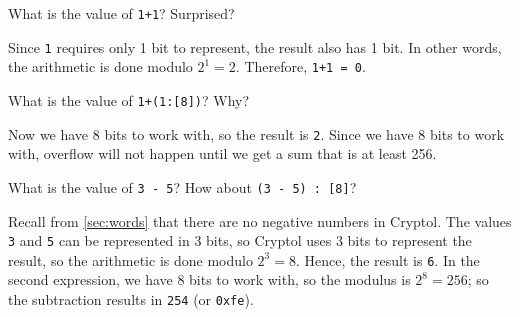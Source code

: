 
\begin{Exercise}\label{ex:arith:1}
What is the value of {\tt 1+1}? Surprised?
\end{Exercise}
\begin{Answer}
  Since {\tt 1} requires only 1 bit to represent, the result also has
  1 bit. In other words, the arithmetic is done modulo $2^1 =
  2$. Therefore, {\tt 1+1 = 0}.
\end{Answer}

\begin{Exercise}\label{ex:arith:2}
What is the value of {\tt 1+(1:[8])}? Why?
\end{Exercise}
\begin{Answer}
  Now we have 8 bits to work with, so the result is {\tt 2}. Since we
  have 8 bits to work with, overflow will not happen until we get a
  sum that is at least 256.
\end{Answer}

\begin{Exercise}\label{ex:arith:3}
What is the value of \texttt{3 - 5}? How about \texttt{(3 - 5) :\ [8]}?
\end{Exercise}
\begin{Answer}
  Recall from \autoref{sec:words} that there are no negative
  numbers in Cryptol. The values \texttt{3} and \texttt{5} can be
  represented in 3 bits, so Cryptol uses 3 bits to represent the
  result, so the arithmetic is done modulo $2^3=8$. Hence, the result
  is \texttt{6}.  In the second expression, we have 8 bits to work with,
  so the modulus is $2^8 = 256$; so the subtraction results in
  \texttt{254} (or \texttt{0xfe}).
\end{Answer}

\indModular\indMinus

